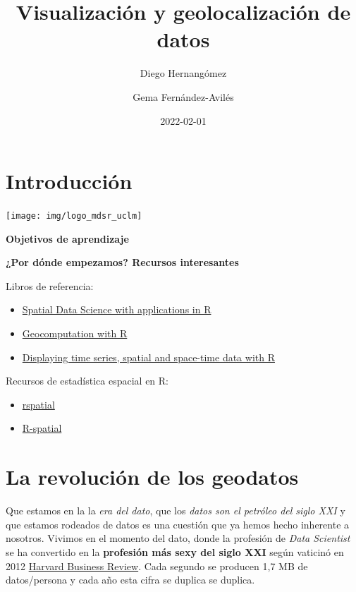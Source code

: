 \documentclass[
]{report}
\title{Visualización y geolocalización de datos}
\author{Diego Hernangómez \and Gema Fernández-Avilés}
\date{2022-02-01}
\providecommand{\tightlist}{%
  \setlength{\itemsep}{0pt}\setlength{\parskip}{0pt}}
\begin{document}
\maketitle

{
\hypersetup{linkcolor=}
\setcounter{tocdepth}{1}
\tableofcontents
}
\hypertarget{introducciuxf3n}{%
\chapter*{Introducción}\label{introducciuxf3n}}

\begin{center}\texttt{[image: img/logo\_mdsr\_uclm]} \end{center}

\textbf{Objetivos de aprendizaje}

\textbf{¿Por dónde empezamos? Recursos interesantes}

Libros de referencia:

\begin{itemize}
\item
  \href{https://keen-swartz-3146c4.netlify.app/}{Spatial Data Science with applications in
  R}
\item
  \href{https://geocompr.robinlovelace.net/}{Geocomputation with R}
\item
  \href{https://oscarperpinan.github.io/bookvis/}{Displaying time series, spatial and space-time data with
  R}
\end{itemize}

Recursos de estadística espacial en R:

\begin{itemize}
\tightlist
\item
  \href{https://rspatial.org/}{rspatial}
\item
  \href{https://r-spatial.org/projects/}{R-spatial}
\end{itemize}

\hypertarget{la-revoluciuxf3n-de-los-geodatos}{%
\chapter{La revolución de los geodatos}\label{la-revoluciuxf3n-de-los-geodatos}}

Que estamos en la la \emph{era del dato}, que los \emph{datos son el petróleo del siglo
XXI} y que estamos rodeados de datos es una cuestión que ya hemos hecho
inherente a nosotros. Vivimos en el momento del dato, donde la profesión de
\emph{Data Scientist} se ha convertido en la \textbf{profesión más sexy del siglo XXI}
según vaticinó en 2012 \href{https://hbr.org/2012/10/data-scientist-the-sexiest-job-of-the-21st-century}{Harvard Business
Review}.
Cada segundo se producen 1,7 MB de datos/persona y cada año esta cifra se
duplica se duplica.
\end{document}
